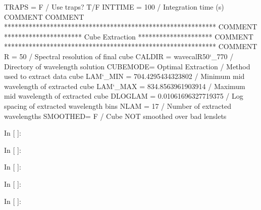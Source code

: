 \documentclass[letterpaper,10pt,english]{sphinxmanual}
\def\PYGZus{\char`\_}
\def\PYGZsq{\char`\'}
\renewcommand\PYGZsq{\textquotesingle}
\begin{document}
\begin{OriginalVerbatim}[commandchars=\\\{\}]
         TRAPS   =                    F / Use traps? T/F
         INTTIME =                  100 / Integration time (s)
         COMMENT
         COMMENT ************************************************************
         COMMENT ********************** Cube Extraction *********************
         COMMENT ************************************************************
         COMMENT
         R       =                   50 / Spectral resolution of final cube
         CALDIR  = \PYGZsq{}wavecalR50\PYGZus{}770\PYGZsq{}     / Directory of wavelength solution
         CUBEMODE= \PYGZsq{}Optimal Extraction\PYGZsq{} / Method used to extract data cube
         LAM\PYGZus{}MIN =    704.4295434323802 / Minimum mid wavelength of extracted cube
         LAM\PYGZus{}MAX =    834.8563961903914 / Maximum mid wavelength of extracted cube
         DLOGLAM =  0.01061696327719375 / Log spacing of extracted wavelength bins
         NLAM    =                   17 / Number of extracted wavelengths
         SMOOTHED=                    F / Cube NOT smoothed over bad lenslets
\end{OriginalVerbatim}

\begin{OriginalVerbatim}[commandchars=\\\{\}]
\textcolor{nbsphinxin}{In [ ]: }
\end{OriginalVerbatim}

\begin{OriginalVerbatim}[commandchars=\\\{\}]
\textcolor{nbsphinxin}{In [ ]: }
\end{OriginalVerbatim}

\begin{OriginalVerbatim}[commandchars=\\\{\}]
\textcolor{nbsphinxin}{In [ ]: }
\end{OriginalVerbatim}

\begin{OriginalVerbatim}[commandchars=\\\{\}]
\textcolor{nbsphinxin}{In [ ]: }
\end{OriginalVerbatim}

\begin{OriginalVerbatim}[commandchars=\\\{\}]
\textcolor{nbsphinxin}{In [ ]: }
\end{OriginalVerbatim}
\end{document}
